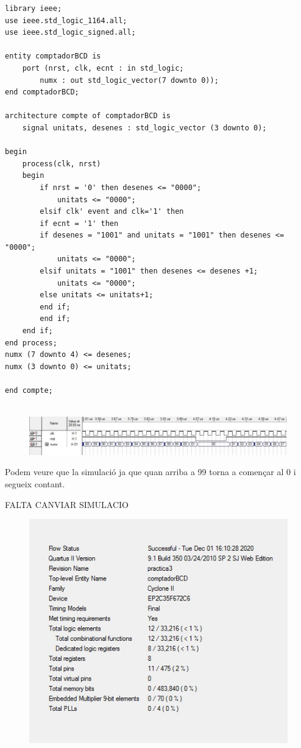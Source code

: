 \documentclass[12pt, a4papre]{article}
\begin{document}
		\begin{lstlisting}[style=vhdl, frame=single, basicstyle=\tiny]
		library ieee;
use ieee.std_logic_1164.all;
use ieee.std_logic_signed.all;

entity comptadorBCD is
	port (nrst, clk, ecnt : in std_logic;
		numx : out std_logic_vector(7 downto 0));
end comptadorBCD;

architecture compte of comptadorBCD is 
	signal unitats, desenes : std_logic_vector (3 downto 0);
	
begin 
	process(clk, nrst)
	begin
	    if nrst = '0' then desenes <= "0000";
			unitats <= "0000";
	    elsif clk' event and clk='1' then
		if ecnt = '1' then
		if desenes = "1001" and unitats = "1001" then desenes <= "0000";
			unitats <= "0000";
		elsif unitats = "1001" then desenes <= desenes +1;
			unitats <= "0000";
		else unitats <= unitats+1;
		end if;
	    end if;
	end if;
end process;
numx (7 downto 4) <= desenes;
numx (3 downto 0) <= unitats;

end compte;
		
		\end{lstlisting}
		
				
\begin{figure}[H]
		\begin{center}
		\includegraphics[width=130mm]{simulacioComptador.jpeg}
		\end{center}
	\end{figure}
	
	Podem veure que la simulació ja que quan arriba a 99 torna a començar al 0 i segueix contant.
	
	FALTA CANVIAR SIMULACIO
\begin{figure}[H]
		\begin{center}
		\includegraphics[width=130mm]{informeComptador.jpeg}
		\end{center}
	\end{figure}
	
\end{document}
